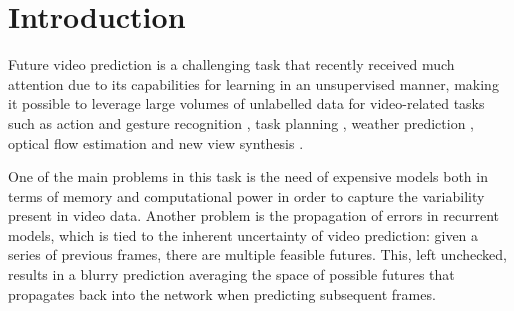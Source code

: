 \documentclass[runningheads]{llncs}
\begin{document}
\section{Introduction}
\label{sec:introduction}

Future video prediction is a challenging task that recently received much attention due to its capabilities for learning in an unsupervised manner, making it possible to leverage large volumes of unlabelled data for video-related tasks such as action and gesture recognition \cite{srivastava2015unsupervised,lotter2016deep,liu2017video}, task planning \cite{oh2015action,ebert2017self}, weather prediction \cite{shi15nowcasting}, optical flow estimation \cite{patraucean2015spatio} and new view synthesis \cite{liu2017video}. 

One of the main problems in this task is the need of expensive models both in terms of memory and computational power in order to capture the variability present in video data. Another problem is the propagation of errors in recurrent models, which is tied to the inherent uncertainty of video prediction: given a series of previous frames, there are multiple feasible futures. This, left unchecked, results in a blurry prediction averaging the space of possible futures that propagates back into the network when predicting subsequent frames.
\end{document}

